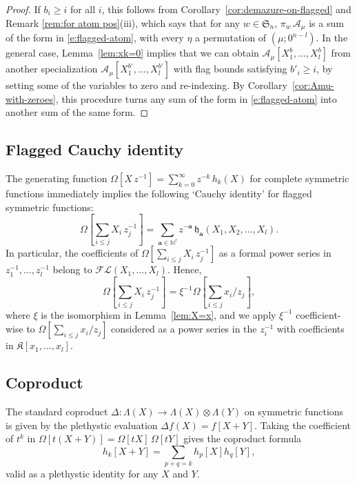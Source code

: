 \documentclass[12pt]{amsart}
\theoremstyle{definition}
\theoremstyle{remark}
\newcommand{\NN}{{\mathbb N}}
\newcommand{\aA}{{\mathbf a}}
\newcommand{\fh}{{\mathfrak h}}
\newcommand{\Dem}{\pi }
\newcommand{\Kfrak}{{\mathfrak K}}
\newcommand{\Sfrak}{{\mathfrak S}}
\newcommand{\Acal}{{\mathcal A}}
\newcommand{\FLambda}{\mathcal{F\!L}}
\begin{document}
\begin{proof}
If $b_{i}\geq i$ for all $i$, this follows from
Corollary~\ref{cor:demazure-on-flagged} and Remark \ref{rem:for atom
pos}(iii), which says that for any $w\in \Sfrak _{n}$, $\Dem _{w}\,
\Acal _{\mu }$ is a sum of the form in \eqref{e:flagged-atom}, with
every $\eta $ a permutation of $(\mu ; 0^{n-l})$.  In the general
case, Lemma~\ref{lem:xk=0} implies that we can obtain $\Acal _{\mu }
[X^b_{1},\ldots,X^b_{l}]$ from another specialization $\Acal _{\mu }
[X^{b'}_{1},\ldots,X^{b'}_{l}]$ with flag bounds satisfying
$b'_{i}\geq i$, by setting some of the variables to zero and
re-indexing.  By Corollary~\ref{cor:Amu-with-zeroes}, this procedure
turns any sum of the form in \eqref{e:flagged-atom} into another sum
of the same form.
\end{proof}

\subsection{Flagged Cauchy identity} \label{ss:flagged-Cauchy}
The generating function $\Omega [X\, z^{-1}] = \sum _{k=0}^{\infty }
z^{-k}\, h_{k}(X)$ for complete symmetric functions immediately
implies the following `Cauchy identity' for flagged symmetric
functions:
\begin{equation}\label{e:flagged-Cauchy}
 \Omega [\sum _{i\leq j} \!\! X_{i}\, z_{j}^{-1} ] = \sum _{\aA
\in \NN ^{l}} z^{-\aA }\, \fh_{\aA }(X_{1}, X_{2}, \ldots, X_{l}).
\end{equation}
In particular, the coefficients of $\Omega [\sum _{i\leq j}X_{i}\,
z_{j}^{-1}]$ as a formal power series in
$z_{1}^{-1},\ldots,z_{l}^{-1}$ belong to $\FLambda (X_{1},\ldots,X_{l})$.
Hence,
\begin{equation}\label{e:xi-on-omega}
\Omega [\sum _{i\leq j}X_{i}\, z_{j}^{-1}] = \xi ^{-1} \Omega [\sum
_{i\leq j} x_{i}/z_{j}],
\end{equation}
where $\xi $ is the isomorphism in Lemma~\ref{lem:X=x}, and we apply
$\xi ^{-1}$ coefficient-wise to $\Omega [\sum _{i\leq j} x_{i}/z_{j}]$
considered as a power series in the $z_{i}^{-1}$ with coefficients in
$\Kfrak [x_{1},\ldots,x_{l}]$.


\subsection{Coproduct}
\label{ss:translation}

The standard coproduct $\Delta \colon \Lambda (X)\rightarrow \Lambda
(X)\otimes \Lambda (Y)$ on symmetric functions is given by the
plethystic evaluation $\Delta f(X) = f[X+Y]$.  Taking the coefficient
of $t^{k}$ in $\Omega [t(X+Y)] = \Omega [t X]\, \Omega [t Y]$ gives
the coproduct formula 
\begin{equation}\label{e:coproduct-of-h}
h_{k}[X+Y] = \sum _{p+q=k} h_{p}[X] h_{q}[Y],
\end{equation}
valid as a plethystic identity for any $X$ and $Y$.
\end{document}
